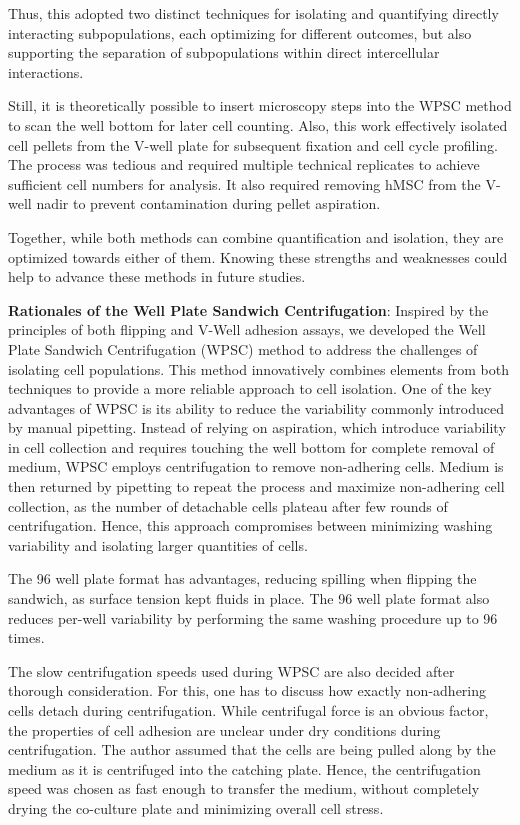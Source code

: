 Thus, this adopted two distinct techniques for isolating and quantifying
directly interacting subpopulations, each optimizing for different outcomes, but
also supporting the separation of subpopulations within direct intercellular
interactions.

Still, it is theoretically possible to insert microscopy steps into the
\ac{WPSC} method to scan the well bottom for later cell counting. Also, this
work effectively isolated cell pellets from the V-well plate for subsequent
fixation and cell cycle profiling. The process was
tedious and required multiple technical replicates to achieve sufficient cell
numbers for analysis. It also required removing \ac{hMSC} from the V-well nadir
to prevent contamination during pellet aspiration.

Together, while both methods can combine quantification and isolation, they
are optimized towards either of them. Knowing these strengths and weaknesses
could help to advance these methods in future studies.






\textbf{Rationales of the Well Plate Sandwich Centrifugation}: Inspired by the
principles of both flipping and V-Well adhesion assays, we developed the Well
Plate Sandwich Centrifugation (\acf{WPSC}) method to address the challenges of
isolating cell populations. This method innovatively combines elements from both
techniques to provide a more reliable approach to cell isolation. One of the key
advantages of WPSC is its ability to reduce the variability commonly introduced
by manual pipetting. Instead of relying on aspiration, which introduce
variability in cell collection and requires touching the well bottom for
complete removal of medium, WPSC employs centrifugation to remove non-adhering
cells. Medium is then returned by pipetting to repeat the process and maximize
non-adhering cell collection, as the number of detachable cells plateau after
few rounds of centrifugation. Hence, this approach compromises
between minimizing washing variability and isolating larger quantities of cells.

The 96 well plate format has advantages, reducing spilling when flipping the
sandwich, as surface tension kept fluids in place. The 96 well plate format also
reduces per-well variability by performing the same washing procedure up to 96
times.

The slow centrifugation speeds used during \ac{WPSC} are also decided after
thorough consideration. For this, one has to discuss how exactly
non-adhering cells detach during centrifugation. While centrifugal force is an
obvious factor, the properties of cell adhesion are unclear under dry conditions
during centrifugation. The author assumed that the cells are being pulled along
by the medium as it is centrifuged into the catching plate. Hence, the centrifugation
speed was chosen as fast enough to transfer the medium, without completely
drying the co-culture plate and minimizing overall cell stress.

